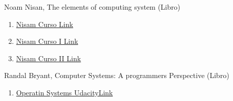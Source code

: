 \documentclass{article} %
\begin{document}
	Noam Nisan, The elements of computing system (Libro)
\begin{enumerate}
	\item 	\href{https://www.coursera.org/learn/build-a-computer}{Nisam Curso Link}
	\item  	\href{https://www.coursera.org/learn/build-a-computer?ranMID=40328&ranEAID=PtFMiHYfEVk&ranSiteID=PtFMiHYfEVk-TDR5b3L08iw3G8Ez2LYblA&siteID=PtFMiHYfEVk-TDR5b3L08iw3G8Ez2LYblA&utm_content=10&utm_medium=partners&utm_source=linkshare&utm_campaign=PtFMiHYfEVk}{Nisam Curso I Link}
	\item  	\href{https://www.coursera.org/learn/nand2tetris2?ranMID=40328&ranEAID=PtFMiHYfEVk&ranSiteID=PtFMiHYfEVk-wIIyFdvFtK.vulAvgoLaWw&siteID=PtFMiHYfEVk-wIIyFdvFtK.vulAvgoLaWw&utm_content=10&utm_medium=partners&utm_source=linkshare&utm_campaign=PtFMiHYfEVk}{Nisam Curso II Link}
\end{enumerate}


Randal Bryant, Computer Systems: A programmers Perspective (Libro)

\begin{enumerate}
	\item  
		\href{https://www.udacity.com/course/introduction-to-operating-systems--ud923?irclickid=WS7TIATqExyLU81wUx0Mo3ImUkB2YpQud0MC1U0&irgwc=1&utm_source=affiliate&utm_medium=&aff=1459666&utm_term=&utm_campaign=__&utm_content=&adid=786224}{Operatin Systems UdacityLink}
\end{enumerate}
\end{document}
